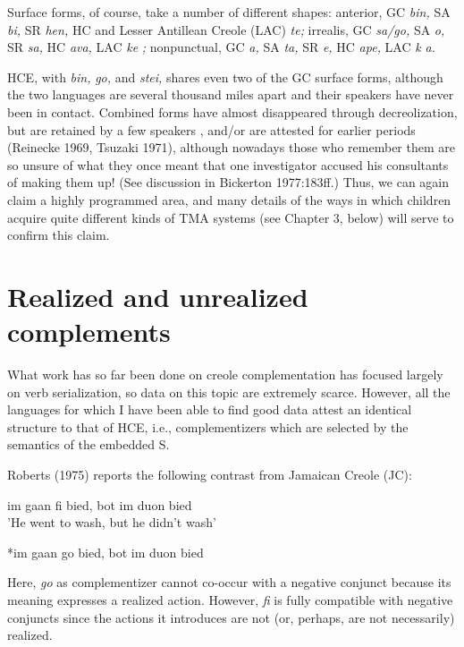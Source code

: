 Surface forms, of course, take a number of different shapes: 
anterior, 
 GC \textit{bin,} 
 SA \textit{bi,} 
 SR \textit{hen,} 
 HC and Lesser Antillean Creole (LAC) \textit{te;} 
irrealis, 
 GC \textit{sa/go,} 
 SA \textit{o,} 
 SR \textit{sa,} 
 HC \textit{ava,} 
 LAC \textit{ke} \textit{;} nonpunctual, 
 GC \textit{a,} 
 SA \textit{ta,} 
 SR \textit{e,} 
 HC \textit{ape,} 
 LAC \textit{k} \textit{a.}

HCE, with \textit{bin,} \textit{go,} and \textit{stei,} shares even two of the GC surface forms, although the two languages are several thousand miles apart and their speakers have never been in contact. Combined forms have almost disappeared through decreolization, but are retained by a few speakers \citep{Bickerton1974}, and/or are attested for earlier periods (Reinecke 1969, Tsuzaki 1971), although nowadays those who remember them are so unsure of what they once meant that one investigator \citep{Perlman1973} accused his consultants of making them up! (See discussion in Bickerton 1977:183ff.) Thus, we can again claim a highly programmed area, and many details of the ways in which children acquire quite different kinds of TMA systems (see Chapter 3, below) will serve to confirm this claim.

\section{Realized and unrealized complements}

What work has so far been done on creole complementation has focused largely on verb serialization, so data on this topic are extremely scarce. However, all the languages for which I have been able to find good data attest an identical structure to that of HCE, i.e., complementizers which are selected by the semantics of the embedded S.

Roberts (1975) reports the following contrast from Jamaican Creole (JC):


\ea\label{ex:27}
im gaan fi bied, bot im duon bied\\
\glt 'He went to wash, but he didn't wash'
\z

\ea\label{ex:28}
 *im gaan go bied, bot im duon bied
\z

Here, \textit{go} as complementizer cannot co-occur with a negative conjunct because its meaning expresses a realized action. However, \textit{fi} is fully
compatible with negative conjuncts since the actions it introduces are not (or, perhaps, are not necessarily) realized.

